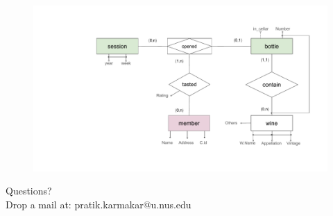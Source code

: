 \documentclass{beamer}
\begin{document}
\begin{frame}
    \begin{figure}
        \centering
        \includegraphics[width=1.1\linewidth]{tut_02_files/21.pdf}
    \end{figure}
\end{frame}

\begin{frame}
\begin{center}
Questions?\\
Drop a mail at: pratik.karmakar@u.nus.edu
\end{center}
\end{frame}
\end{document}
